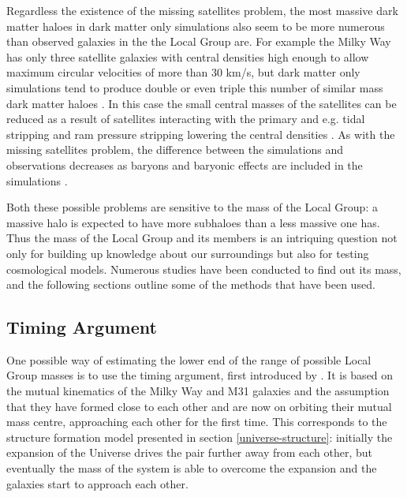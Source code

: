\documentclass[english, oneside]{HYgradu}
\begin{document}
Regardless the existence of the missing satellites problem, the most massive dark matter haloes in dark matter only simulations also seem to be more numerous than observed galaxies in the the Local Group are. For example the Milky Way has only three satellite galaxies with central densities high enough to allow maximum circular velocities of more than 30 km/s, but dark matter only simulations tend to produce double or even triple this number of similar mass dark matter haloes \citep{sawala2016apostle}. In this case the small central masses of the satellites can be reduced as a result of satellites interacting with the primary and e.g. tidal stripping and ram pressure stripping lowering the central densities \citep{bullock2017small}. As with the missing satellites problem, the difference between the simulations and observations decreases as baryons and baryonic effects are included in the simulations \citep{sawala2016apostle}.

Both these possible problems are sensitive to the mass of the Local Group: a massive halo is expected to have more subhaloes than a less massive one has. Thus the mass of the Local Group and its members is an intriquing question not only for building up knowledge about our surroundings but also for testing cosmological models. Numerous studies have been conducted to find out its mass, and the following sections outline some of the methods that have been used.

\subsection{Timing Argument}
One possible way of estimating the lower end of the range of possible Local Group masses is to use the timing argument, first introduced by \citet{kahn1959intergalactic}. It is based on the mutual kinematics of the Milky Way and M31 galaxies and the assumption that they have formed close to each other and are now on orbiting their mutual mass centre, approaching each other for the first time. This corresponds to the structure formation model presented in section \ref{universe-structure}: initially the expansion of the Universe drives the pair further away from each other, but eventually the mass of the system is able to overcome the expansion and the galaxies start to approach each other.
\end{document}

